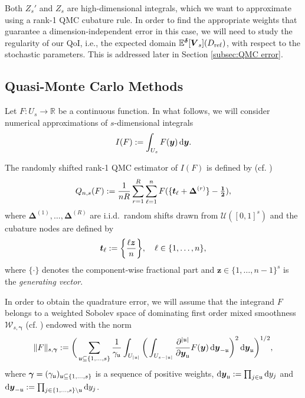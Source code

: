 \documentclass[graybox]{svmult}
\begin{document}
Both $Z_s'$ and $Z_s$ are high-dimensional integrals, which we want to approximate using a rank-1 QMC cubature rule. In order to find the appropriate weights that guarantee a dimension-independent error in this case, we will need to study the regularity of our QoI, i.e., the expected domain $\mathbb{E}^{{\boldsymbol{\delta}}}[{\boldsymbol{V}}_s](D_{\rm ref})$, with respect to the stochastic parameters. This is addressed later in Section \ref{subsec:QMC error}.


\subsection{Quasi-Monte Carlo Methods}\label{subsec:qmc}
Let $F\!:U_s\to\mathbb R$ be a continuous function. In what follows, we will consider numerical approximations of $s$-dimensional integrals
$$
I(F):=\int_{U_s}F({\boldsymbol{y}})\,{\rm d}{\boldsymbol{y}}.
$$

The randomly shifted rank-1 QMC estimator of $I(F)$ is defined by (cf. \cite{actanumer})
$$
Q_{n, s}(F):=\frac{1}{nR}\sum_{r=1}^R \sum_{\ell=1}^n F(\{{\boldsymbol{t}}_\ell+\boldsymbol\Delta^{(r)}\}-\tfrac{\mathbf 1}{\mathbf 2}),
$$
where $\boldsymbol\Delta^{(1)},\ldots,\boldsymbol\Delta^{(R)}$ are i.i.d.~random shifts drawn from $\mathcal U([0,1]^s)$ and the cubature nodes are defined by
$$
{\boldsymbol{t}}_\ell:=\bigg\{\frac{\ell\boldsymbol z}{n}\bigg\},\quad \ell\in\{1,\ldots,n\},
$$
where $\{\cdot\}$ denotes the component-wise fractional part and $\boldsymbol z\in\{1,\ldots,n-1\}^s$ is the {\em generating vector}.


In order to obtain the quadrature error, we will assume that 
the integrand $F$ belongs to a weighted Sobolev space of dominating first order mixed smoothness $\mathcal W_{s,\boldsymbol\gamma}$ (cf. \cite{kuonuyenssurvey}) endowed with the norm
$$
\|F\|_{s,{\boldsymbol{\gamma}}}:=\bigg(\sum_{{\mathfrak{u}}\subseteq\{1,\ldots,s\}}\frac{1}{\gamma_{{\mathfrak{u}}}}\int_{U_{|{\mathfrak{u}}|}}\bigg(\int_{U_{s-|{\mathfrak{u}}|}}\frac{\partial^{|{\mathfrak{u}}|}}{\partial{\boldsymbol{y}}_{{\mathfrak{u}}}}F({\boldsymbol{y}})\,{\rm d}{\boldsymbol{y}}_{-{\mathfrak{u}}}\bigg)^2\,{\rm d}{\boldsymbol{y}}_{{\mathfrak{u}}}\bigg)^{1/2},
$$
where $\boldsymbol\gamma=(\gamma_{{\mathfrak{u}}})_{{\mathfrak{u}}\subseteq\{1,\ldots,s\}}$ is a sequence of positive weights, ${\rm d}{\boldsymbol{y}}_{{\mathfrak{u}}}:=\prod_{j\in{\mathfrak{u}}}{\rm d}y_j$ and ${\rm d}{\boldsymbol{y}}_{-{\mathfrak{u}}}:=\prod_{j\in\{1,\ldots,s\}\setminus{\mathfrak{u}}}{\rm d}y_j$.
\end{document}

